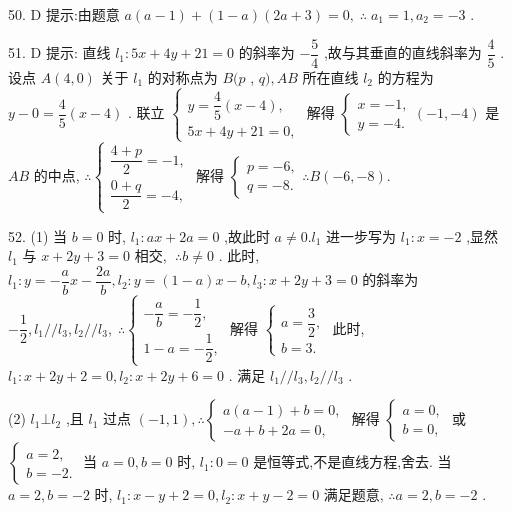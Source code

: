 50. D 提示:由题意 $a\left( {a - 1}\right)  + \left( {1 - a}\right) \left( {{2a} + 3}\right)  = 0,\;\therefore \;{a}_{1} = 1,{a}_{2} =  - 3$ .

51. D 提示: 直线 ${l}_{1} : {5x} + {4y} + {21} = 0$ 的斜率为 $- \dfrac{5}{4}$ ,故与其垂直的直线斜率为 $\dfrac{4}{5}$ . 设点 $A\left( {4,0}\right)$ 关于 ${l}_{1}$ 的对称点为 $B(p$ , $q),{AB}$ 所在直线 ${l}_{2}$ 的方程为 $y - 0 = \dfrac{4}{5}\left( {x - 4}\right)$ . 联立 $\left\{  \begin{array}{l} y = \dfrac{4}{5}\left( {x - 4}\right) , \\  {5x} + {4y} + {21} = 0, \end{array}\right.$ 解得 $\left\{  \begin{array}{l} x =  - 1, \\  y =  - 4. \end{array}\right. \left( {-1, - 4}\right)$ 是 ${AB}$ 的中点, $\therefore \left\{  {\begin{array}{l} \dfrac{4 + p}{2} =  - 1, \\  \dfrac{0 + q}{2} =  - 4, \end{array}\text{ 解得 }\left\{  {\begin{array}{l} p =  - 6, \\  q =  - 8. \end{array}\therefore B\left( {-6, - 8}\right) .}\right. }\right.$

52. (1) 当 $b = 0$ 时, ${l}_{1} : {ax} + {2a} = 0$ ,故此时 $a \neq  0.{l}_{1}$ 进一步写为 ${l}_{1} : x =  - 2$ ,显然 ${l}_{1}$ 与 $x + {2y} + 3 = 0$ 相交, $\;\therefore b \neq  0$ . 此时, ${l}_{1} : y =  - \dfrac{a}{b}x - \dfrac{2a}{b},{l}_{2} : y = \left( {1 - a}\right) x - b,{l}_{3} : x + {2y} + 3 = 0$ 的斜率为 $- \dfrac{1}{2},{l}_{1}//{l}_{3},{l}_{2}//{l}_{3},\;\therefore \left\{  \begin{array}{l}  - \dfrac{a}{b} =  - \dfrac{1}{2}, \\  1 - a =  - \dfrac{1}{2}, \end{array}\right.$ 解得 $\left\{  \begin{array}{l} a = \dfrac{3}{2}, \\  b = 3. \end{array}\right.$ 此时, ${l}_{1} : x + {2y} + 2 = 0,{l}_{2} : x + {2y} + 6 = 0$ . 满足 ${l}_{1}//{l}_{3},{l}_{2}//{l}_{3}$ .

(2) ${l}_{1} \bot  {l}_{2}$ ,且 ${l}_{1}$ 过点 $\left( {-1,1}\right) ,\therefore \left\{  \begin{array}{l} a\left( {a - 1}\right)  + b = 0, \\   - a + b + {2a} = 0, \end{array}\right.$ 解得 $\left\{  \begin{array}{l} a = 0, \\  b = 0, \end{array}\right.$ 或 $\left\{  \begin{array}{l} a = 2, \\  b =  - 2. \end{array}\right.$ 当 $a = 0,b = 0$ 时, ${l}_{1} : 0 = 0$ 是恒等式,不是直线方程,舍去. 当 $a = 2,b =  - 2$ 时, ${l}_{1} : x - y + 2 = 0,{l}_{2} : x + y - 2 = 0$ 满足题意, $\therefore a = 2,b =  - 2$ .

